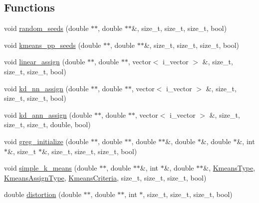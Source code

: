 \subsection*{Functions}
\begin{DoxyCompactItemize}
\item 
void \hyperlink{namespaceSimpleCluster_a7220a80d5dfa93f7bee701a9abd606e9}{random\-\_\-seeds} (double $\ast$$\ast$, double $\ast$$\ast$\&, size\-\_\-t, size\-\_\-t, size\-\_\-t, bool)
\item 
void \hyperlink{namespaceSimpleCluster_a26dcc8efa5e3bd2663d90c07c8910ada}{kmeans\-\_\-pp\-\_\-seeds} (double $\ast$$\ast$, double $\ast$$\ast$\&, size\-\_\-t, size\-\_\-t, size\-\_\-t, bool)
\item 
void \hyperlink{namespaceSimpleCluster_a8576edc91afddb43f8afbeb432ef71f1}{linear\-\_\-assign} (double $\ast$$\ast$, double $\ast$$\ast$, vector$<$ i\-\_\-vector $>$ \&, size\-\_\-t, size\-\_\-t, size\-\_\-t, bool)
\item 
void \hyperlink{namespaceSimpleCluster_a2b33da107293a0437ecae4e2f4a542f7}{kd\-\_\-nn\-\_\-assign} (double $\ast$$\ast$, double $\ast$$\ast$, vector$<$ i\-\_\-vector $>$ \&, size\-\_\-t, size\-\_\-t, size\-\_\-t, bool)
\item 
void \hyperlink{namespaceSimpleCluster_a8c738770af7344c7547016a6b8859463}{kd\-\_\-ann\-\_\-assign} (double $\ast$$\ast$, double $\ast$$\ast$, vector$<$ i\-\_\-vector $>$ \&, size\-\_\-t, size\-\_\-t, size\-\_\-t, double, bool)
\item 
void \hyperlink{namespaceSimpleCluster_ae1679d348fc3d1e775bb134d36f1d722}{greg\-\_\-initialize} (double $\ast$$\ast$, double $\ast$$\ast$, double $\ast$$\ast$\&, double $\ast$\&, double $\ast$\&, int $\ast$\&, size\-\_\-t $\ast$\&, size\-\_\-t, size\-\_\-t, size\-\_\-t, bool)
\item 
void \hyperlink{namespaceSimpleCluster_a81cc95b28c2dbf13507df024fe8213fe}{simple\-\_\-k\-\_\-means} (double $\ast$$\ast$, double $\ast$$\ast$\&, int $\ast$\&, double $\ast$$\ast$\&, \hyperlink{namespaceSimpleCluster_a8a8f57121b69a7b43575e4d6a53928e2}{Kmeans\-Type}, \hyperlink{namespaceSimpleCluster_a1ad2d6129171ff9a5ee57f48b5f3f6e1}{Kmeans\-Assign\-Type}, \hyperlink{structSimpleCluster_1_1KmeansCriteria}{Kmeans\-Criteria}, size\-\_\-t, size\-\_\-t, size\-\_\-t, bool)
\item 
double \hyperlink{namespaceSimpleCluster_a906f27865548931fd05261b39021af1e}{distortion} (double $\ast$$\ast$, double $\ast$$\ast$, int $\ast$, size\-\_\-t, size\-\_\-t, size\-\_\-t, bool)
\item 

\end{DoxyCompactItemize}
